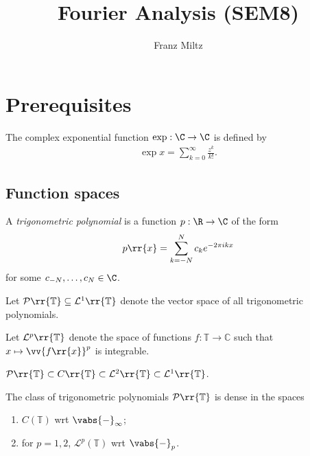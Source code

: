 \documentclass{article}
\begin{document}
\mkthmstwounified
\title{Fourier Analysis (SEM8)}
\author{Franz Miltz}
\maketitle
\tableofcontents
\pagebreak

\section{Prerequisites}

\begin{definition}
  The complex exponential function $\exp : \C\to\C$ is defined by
  \begin{align*}
    \exp x = \sum_{k=0}^{ \infty } \frac{z^k}{k!}.
  \end{align*}
\end{definition}

\subsection{Function spaces}


\begin{definition}
  A \emph{trigonometric polynomial} is a function $p:\R\to\C$ of the form
  \begin{align*}
    p\rr{x} = \sum_{k=-N}^N c_k e^{-2\pi i k x}
  \end{align*}
  for some $c_{-N},\ldots,c_N\in\C$.

  Let $\mathcal P\rr{\mathbb T}\subseteq\mathcal L^1\rr{\mathbb T}$ denote the vector space
  of all trigonometric polynomials.
\end{definition}

\begin{definition}
  Let $\mathcal L^p\rr{\mathbb T}$ denote the space of functions
  $f:\mathbb T\to\mathbb C$ such that $x\mapsto\vv{f\rr{x}}^p$ is integrable.
\end{definition}

\begin{lemma}
  $\mathcal P\rr{\mathbb T}\subset C\rr{\mathbb T}\subset \mathcal L^2\rr{\mathbb T}\subset\mathcal L^1\rr{\mathbb T}$.
\end{lemma}

\begin{lemma}
  The class of trigonometric polynomials $\mathcal P\rr{\mathbb T}$ is dense in the spaces
  \begin{enumerate}
    \item $C(\mathbb T)$ wrt $\vabs{-}_{\infty}$;
    \item for $p=1,2$, $\mathcal L^p(\mathbb T)$ wrt $\vabs{-}_{p}$.
  \end{enumerate}
\end{lemma}
\end{document}
